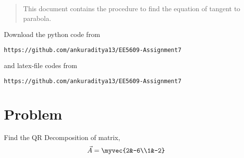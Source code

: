 \documentclass[journal,12pt,twocolumn]{IEEEtran}
\begin{document}
\begin{abstract}
This document contains the procedure to find the equation of tangent to parabola.
\end{abstract}
Download the python code from 
\begin{lstlisting}
https://github.com/ankuraditya13/EE5609-Assignment7
\end{lstlisting}
%
and latex-file codes from 
%
\begin{lstlisting}
https://github.com/ankuraditya13/EE5609-Assignment7
\end{lstlisting}

\section{Problem}
Find the QR Decomposition of matrix,
\begin{align}
\vec{A} = \myvec{2&-6\\1&-2}
\label{Q}
\end{align}
\end{document}
